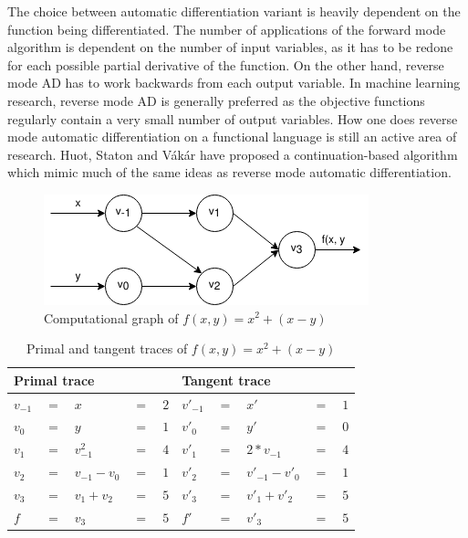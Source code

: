 \documentclass[11pt, final]{article}
\def\Vakar{V\'{a}k\'{a}r}
\begin{document}
The choice between automatic differentiation variant is heavily dependent on the function being differentiated. The number of applications of the forward mode algorithm is dependent on the number of input variables, as it has to be redone for each possible partial derivative of the function. On the other hand, reverse mode AD has to work backwards from each output variable. In machine learning research, reverse mode AD is generally preferred as the objective functions regularly contain a very small number of output variables. How one does reverse mode automatic differentiation on a functional language is still an active area of research. Huot, Staton and \Vakar{} have proposed a continuation-based algorithm which mimic much of the same ideas as reverse mode automatic differentiation\cite{huot2020correctness}.

\begin{figure}
  \centering
  \includegraphics[scale=0.6]{assets/function_trace.png}
  \caption{Computational graph of $f(x, y) = x^2 + (x - y)$}
  \label{fig:func_trace}
\end{figure}

\begin{table}
  \begin{center}
    \begin{tabular}{ l l l l l | l l l l l }
      \hline
      \multicolumn{5}{l}{Primal trace} & \multicolumn{5}{l}{Tangent trace} \\
      \hline
$v_{-1} $&$=$&$x$&$=$&$2$             &$v'_{-1}$&$=$&$x'$&$=$&$1$ \\
$v_0    $&$=$&$y$&$=$&$1$             &$v'_{0}$&$=$&$y'$&$=$&$0$ \\
      \hline
$v_1    $&$=$&$v_{-1}^2$&$=$&$4$      &$v'_{1}$&$=$&$2*v_{-1}$&$=$&$4$ \\
$v_2    $&$=$&$v_{-1} - v_{0}$&$=$&$1$&$v'_{2}$&$=$&$v'_{-1}-v'_{0}$&$=$&$1$ \\
$v_3    $&$=$&$v_1 + v_2$&$=$&$5$     &$v'_{3}$&$=$&$v'_1 + v'_2$&$=$&$5$ \\
      \hline
$f      $&$=$&$v_3$&$=$&$5$           &$f'$&$=$&$v'_3$&$=$&$5$ \\
      \hline
    \end{tabular}
  \end{center}
  \caption{Primal and tangent traces of $f(x, y) = x^2 + (x - y)$}
  \label{table:func_trace}
\end{table}
\end{document}
